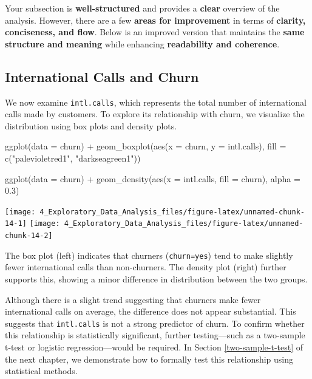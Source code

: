 \documentclass[
  11pt,
]{book}
\makeatletter
\newenvironment{Shaded}{}{}
\newcommand{\AttributeTok}[1]{#1}
\newcommand{\FloatTok}[1]{#1}
\newcommand{\FunctionTok}[1]{#1}
\newcommand{\NormalTok}[1]{#1}
\newcommand{\SpecialCharTok}[1]{\textcolor[rgb]{0.39,0.39,0.39}{#1}}
\newcommand{\StringTok}[1]{\textcolor[rgb]{0.39,0.39,0.39}{#1}}
\newenvironment{kframe}{%
\medskip{}
\setlength{\fboxsep}{.8em}
 \def\at@end@of@kframe{}%
 \ifinner\ifhmode%
  \def\at@end@of@kframe{\end{minipage}}%
  \begin{minipage}{\columnwidth}%
 \fi\fi%
 \def\FrameCommand##1{\hskip\@totalleftmargin \hskip-\fboxsep
 \colorbox{shadecolor}{##1}\hskip-\fboxsep
     \hskip-\linewidth \hskip-\@totalleftmargin \hskip\columnwidth}%
 \MakeFramed {\advance\hsize-\width
   \@totalleftmargin\z@ \linewidth\hsize
   \@setminipage}}%
 {\par\unskip\endMakeFramed%
 \at@end@of@kframe}
\renewenvironment{Shaded}{\begin{kframe}}{\end{kframe}}
\theoremstyle{definition}
\theoremstyle{definition}
\theoremstyle{definition}
\theoremstyle{definition}
\theoremstyle{remark}
\makeatother
\begin{document}
Your subsection is \textbf{well-structured} and provides a \textbf{clear} overview of the analysis. However, there are a few \textbf{areas for improvement} in terms of \textbf{clarity, conciseness, and flow}. Below is an improved version that maintains the \textbf{same structure and meaning} while enhancing \textbf{readability and coherence}.

\subsection*{International Calls and Churn}\label{international-calls-and-churn}


We now examine \texttt{intl.calls}, which represents the total number of international calls made by customers. To explore its relationship with churn, we visualize the distribution using box plots and density plots.

\begin{Shaded}
\begin{Highlighting}[]
\FunctionTok{ggplot}\NormalTok{(}\AttributeTok{data =}\NormalTok{ churn) }\SpecialCharTok{+}
    \FunctionTok{geom\_boxplot}\NormalTok{(}\FunctionTok{aes}\NormalTok{(}\AttributeTok{x =}\NormalTok{ churn, }\AttributeTok{y =}\NormalTok{ intl.calls), }
                 \AttributeTok{fill =} \FunctionTok{c}\NormalTok{(}\StringTok{"palevioletred1"}\NormalTok{, }\StringTok{"darkseagreen1"}\NormalTok{))}

\FunctionTok{ggplot}\NormalTok{(}\AttributeTok{data =}\NormalTok{ churn) }\SpecialCharTok{+}
    \FunctionTok{geom\_density}\NormalTok{(}\FunctionTok{aes}\NormalTok{(}\AttributeTok{x =}\NormalTok{ intl.calls, }\AttributeTok{fill =}\NormalTok{ churn), }\AttributeTok{alpha =} \FloatTok{0.3}\NormalTok{)}
\end{Highlighting}
\end{Shaded}

\texttt{[image: 4\_Exploratory\_Data\_Analysis\_files/figure-latex/unnamed-chunk-14-1]} \texttt{[image: 4\_Exploratory\_Data\_Analysis\_files/figure-latex/unnamed-chunk-14-2]}

The box plot (left) indicates that churners (\texttt{churn=yes}) tend to make slightly fewer international calls than non-churners. The density plot (right) further supports this, showing a minor difference in distribution between the two groups.

Although there is a slight trend suggesting that churners make fewer international calls on average, the difference does not appear substantial. This suggests that \texttt{intl.calls} is not a strong predictor of churn. To confirm whether this relationship is statistically significant, further testing---such as a two-sample t-test or logistic regression---would be required. In Section \ref{two-sample-t-test} of the next chapter, we demonstrate how to formally test this relationship using statistical methods.
\end{document}
